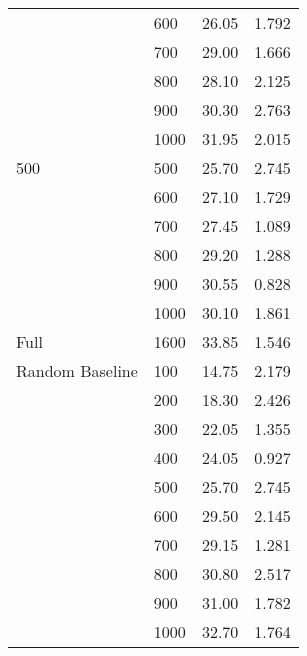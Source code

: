 \begin{tabular}{llrr}
                & 600  &  26.05 &  1.792 \\
                & 700  &  29.00 &  1.666 \\
                & 800  &  28.10 &  2.125 \\
                & 900  &  30.30 &  2.763 \\
                & 1000 &  31.95 &  2.015 \\
500 & 500  &  25.70 &  2.745 \\
                & 600  &  27.10 &  1.729 \\
                & 700  &  27.45 &  1.089 \\
                & 800  &  29.20 &  1.288 \\
                & 900  &  30.55 &  0.828 \\
                & 1000 &  30.10 &  1.861 \\
Full & 1600 &  33.85 &  1.546 \\
Random Baseline & 100  &  14.75 &  2.179 \\
                & 200  &  18.30 &  2.426 \\
                & 300  &  22.05 &  1.355 \\
                & 400  &  24.05 &  0.927 \\
                & 500  &  25.70 &  2.745 \\
                & 600  &  29.50 &  2.145 \\
                & 700  &  29.15 &  1.281 \\
                & 800  &  30.80 &  2.517 \\
                & 900  &  31.00 &  1.782 \\
                & 1000 &  32.70 &  1.764 \\
\bottomrule
\end{tabular}
